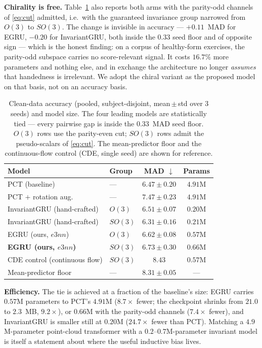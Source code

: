 \textbf{Chirality is free.} Table~\ref{tab:accuracy} also reports both arms with the parity-odd
channels of \eqref{eq:cut} admitted, i.e.\ with the guaranteed invariance group narrowed from $O(3)$
to $SO(3)$. The change is invisible in accuracy --- $+0.11$~MAD for EGRU, $-0.20$ for InvariantGRU,
both inside the $0.33$ seed floor and of opposite sign --- which is the honest finding: on a corpus of
healthy-form exercises, the parity-odd subspace carries no score-relevant signal. It costs $16.7\%$
more parameters and nothing else, and in exchange the architecture no longer \emph{assumes} that
handedness is irrelevant. We adopt the chiral variant as the proposed model on that basis, not on an
accuracy basis.

\begin{table}[!t]
\centering
\caption{Clean-data accuracy (pooled, subject-disjoint, mean\,$\pm$\,std over 3 seeds) and model
size. The four leading models are statistically tied --- every pairwise gap is inside the $0.33$~MAD
seed floor. $O(3)$ rows use the parity-even cut; $SO(3)$ rows admit the pseudo-scalars of
\eqref{eq:cut}. The mean-predictor floor and the continuous-flow control (CDE, single seed) are shown
for reference.}
\label{tab:accuracy}
\small
\setlength{\tabcolsep}{4pt}
\begin{tabular}{llcc}
\toprule
Model & Group & MAD $\downarrow$ & Params \\
\midrule
PCT (baseline)                & --- & $\mathbf{6.47 \pm 0.20}$ & $4.91$M \\
PCT $+$ rotation aug.         & --- & $7.47 \pm 0.23$ & $4.91$M \\
InvariantGRU (hand-crafted)   & $O(3)$  & $\mathbf{6.51 \pm 0.07}$ & $0.20$M \\
InvariantGRU (hand-crafted)   & $SO(3)$ & $\mathbf{6.31 \pm 0.16}$ & $0.21$M \\
EGRU (ours, $e3nn$)           & $O(3)$  & $\mathbf{6.62 \pm 0.08}$ & $0.57$M \\
\textbf{EGRU (ours, $e3nn$)}  & $SO(3)$ & $\mathbf{6.73 \pm 0.30}$ & $0.66$M \\
\midrule
CDE control (continuous flow) & $SO(3)$ & $8.43$\phantom{$\,\pm0.00$} & $0.57$M \\
Mean-predictor floor          & --- & $8.31 \pm 0.05$ & --- \\
\bottomrule
\end{tabular}
\end{table}

\textbf{Efficiency.} The tie is achieved at a fraction of the baseline's size: EGRU carries
$0.57$M parameters to PCT's $4.91$M ($8.7\times$ fewer; the checkpoint shrinks from $21.0$ to
$2.3$~MB, $9.2\times$), or $0.66$M with the parity-odd channels ($7.4\times$ fewer), and InvariantGRU
is smaller still at $0.20$M ($24.7\times$ fewer than PCT). Matching a $4.9$M-parameter point-cloud
transformer with a $0.2$--$0.7$M-parameter invariant model is itself a statement about where the
useful inductive bias lives.

